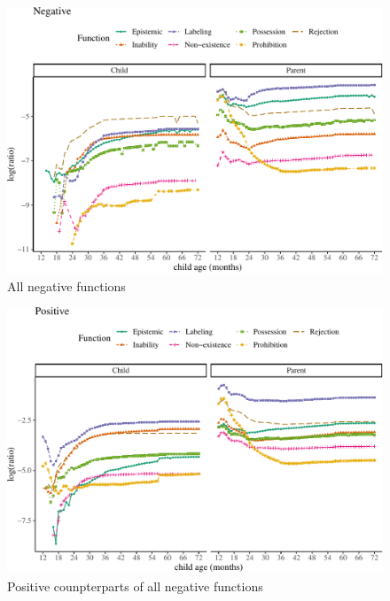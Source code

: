 \documentclass[
  english,
  man,floatsintext]{apa6}
\begin{document}
\begin{figure}[H]

{\centering \includegraphics{neg_construction_article_files/figure-latex/allneg-1} 

}

\caption{All negative functions}\label{fig:allneg}
\end{figure}

\clearpage

\begin{figure}[H]

{\centering \includegraphics{neg_construction_article_files/figure-latex/allpos-1} 

}

\caption{Positive counpterparts of all negative functions}\label{fig:allpos}
\end{figure}
\end{document}
